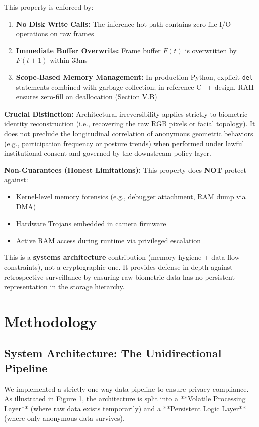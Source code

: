 \documentclass[conference]{IEEEtran}
\begin{document}
This property is enforced by:
\begin{enumerate}
    \item \textbf{No Disk Write Calls:} The inference hot path contains zero file I/O operations on raw frames
    \item \textbf{Immediate Buffer Overwrite:} Frame buffer $F(t)$ is overwritten by $F(t+1)$ within 33ms
    \item \textbf{Scope-Based Memory Management:} In production Python, explicit \texttt{del} statements combined with garbage collection; in reference C++ design, RAII ensures zero-fill on deallocation (Section V.B)
\end{enumerate}

\textbf{Crucial Distinction:} Architectural irreversibility applies strictly to biometric identity reconstruction (i.e., recovering the raw RGB pixels or facial topology). It does not preclude the longitudinal correlation of anonymous geometric behaviors (e.g., participation frequency or posture trends) when performed under lawful institutional consent and governed by the downstream policy layer.

\textbf{Non-Guarantees (Honest Limitations):}
This property does \textbf{NOT} protect against:
\begin{itemize}
    \item Kernel-level memory forensics (e.g., debugger attachment, RAM dump via DMA)
    \item Hardware Trojans embedded in camera firmware
    \item Active RAM access during runtime via privileged escalation
\end{itemize}

This is a \textbf{systems architecture} contribution (memory hygiene + data flow constraints), not a cryptographic one. It provides defense-in-depth against retrospective surveillance by ensuring raw biometric data has no persistent representation in the storage hierarchy.

\section{Methodology}

\subsection{System Architecture: The Unidirectional Pipeline}
We implemented a strictly one-way data pipeline to ensure privacy compliance. As illustrated in Figure 1, the architecture is split into a **Volatile Processing Layer** (where raw data exists temporarily) and a **Persistent Logic Layer** (where only anonymous data survives).
\end{document}
